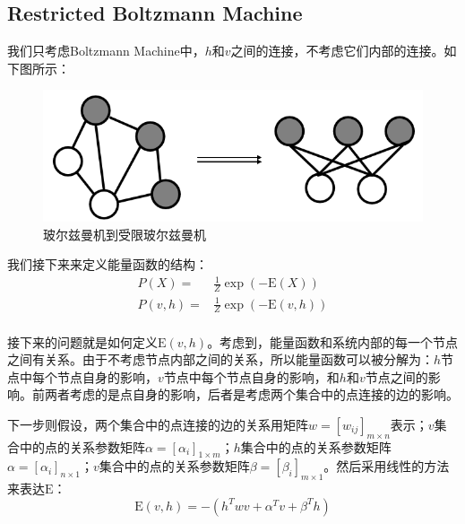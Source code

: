 \documentclass[a4paper]{article}
\begin{document}
\subsection{Restricted Boltzmann Machine}
我们只考虑Boltzmann Machine中，$h$和$v$之间的连接，不考虑它们内部的连接。如下图所示：
\begin{figure}[H]
    \centering
    \includegraphics[width=.6\textwidth]{微信图片_20200229000824.png}
    \caption{玻尔兹曼机到受限玻尔兹曼机}
    
\end{figure}

我们接下来来定义能量函数的结构：
\begin{equation}
    \begin{split}
        P(X) 
        = & \frac{1}{Z} \exp (-\mathrm{E}(X)) \\
        P(v,h) 
        = &  \frac{1}{Z} \exp (-\mathrm{E}(v,h)) \\
    \end{split}
\end{equation}

接下来的问题就是如何定义$\mathrm{E}(v,h)$。考虑到，能量函数和系统内部的每一个节点之间有关系。由于不考虑节点内部之间的关系，所以能量函数可以被分解为：$h$节点中每个节点自身的影响，$v$节点中每个节点自身的影响，和$h$和$v$节点之间的影响。前两者考虑的是点自身的影响，后者是考虑两个集合中的点连接的边的影响。

下一步则假设，两个集合中的点连接的边的关系用矩阵$w=[w_{ij}]_{m\times n}$表示；$v$集合中的点的关系参数矩阵$\alpha=[\alpha_i]_{1\times m}$；$h$集合中的点的关系参数矩阵$\alpha=[\alpha_i]_{n\times 1}$；$v$集合中的点的关系参数矩阵$\beta=[\beta_i]_{m\times 1}$。然后采用线性的方法来表达$\mathrm{E}$：
\begin{equation}
    \mathrm{E}(v,h) = - (h^T w v + \alpha^T v + \beta^T h)
\end{equation}
\end{document}
